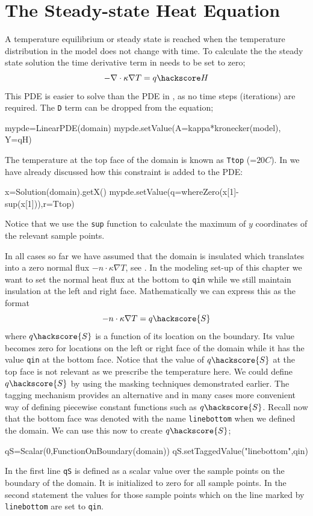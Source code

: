 \section{The Steady-state Heat Equation}
A temperature equilibrium or steady state is reached when the temperature distribution in the model does not change with time. To calculate the 
the steady state solution the time derivative term in  needs to be set to zero;
\begin{equation}\label{eqn:Tform nabla steady}
-\nabla \cdot \kappa \nabla T = q\hackscore H
\end{equation}
This PDE is easier to solve than the PDE in , as no time steps (iterations) are required. The \verb|D| term can be dropped from the equation;
\begin{python}
mypde=LinearPDE(domain)
mypde.setValue(A=kappa*kronecker(model), Y=qH)
\end{python}
The temperature at the top face of the domain is known as \verb|Ttop| (=$20 C$). In  we have 
already discussed how this constraint is added to the PDE:
\begin{python}
x=Solution(domain).getX()
mypde.setValue(q=whereZero(x[1]-sup(x[1])),r=Ttop)
\end{python}
Notice that we use the \verb|sup| function to calculate the maximum of $y$ coordinates of the relevant sample points.

In all cases so far we have assumed that the domain is insulated which translates 
into a zero normal flux $-n \cdot \kappa \nabla T$, see . In the modeling
set-up of this chapter we want to set the normal heat flux at the bottom to \verb|qin| while we still
maintain insulation at the left and right face. Mathematically we can express this as the format
\begin{equation}
-n \cdot \kappa \nabla T = q\hackscore{S}
\label{eq:inhom flux}
\end{equation}
where $q\hackscore{S}$ is a function of its location on the boundary. Its value becomes zero
for locations on the left or right face of the domain while it has the value \verb|qin| at the bottom face.
Notice that the value of $q\hackscore{S}$ at the top face is not relevant as we prescribe the temperature here.
We could define $q\hackscore{S}$ by using the masking techniques demonstrated earlier. The tagging mechanism provides an alternative and in many cases more convenient way of defining piecewise 
constant functions such as $q\hackscore{S}$. Recall now that the bottom face was
denoted with the name \verb|linebottom| when we defined the domain. 
We can use this now to create $q\hackscore{S}$;
\begin{python}
qS=Scalar(0,FunctionOnBoundary(domain))
qS.setTaggedValue("linebottom",qin)
\end{python}
In the first line \verb|qS| is defined as a scalar value over the sample points on the boundary of the domain. It is
initialized to zero for all sample points. In the second statement the values for those sample points which
on the line marked by \verb|linebottom| are set to \verb|qin|. 

